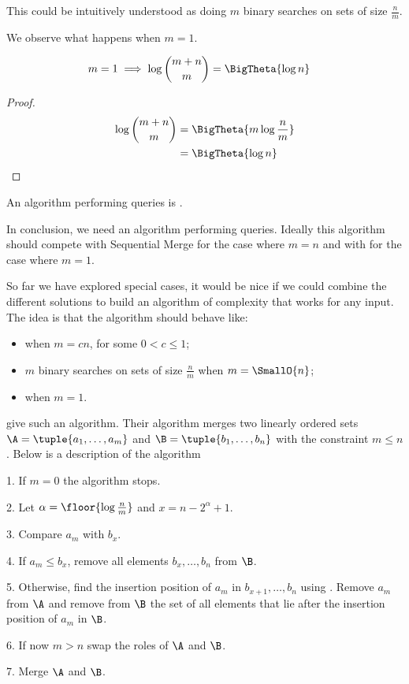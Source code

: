 This could be intuitively understood as doing $m$ binary searches on sets of
size $\frac{n}{m}$.

We observe what happens when $m = 1$.
\begin{lemma}
\begin{align*}
m = 1 &\implies \log\binom{m+n}{m} = \BigTheta{\log n}
\end{align*}
\end{lemma}
\begin{proof}
\begin{align*}
\log\binom{m+n}{m} &= \BigTheta{m \log\frac{n}{m}}\\
&= \BigTheta{\log n}\qedhere
\end{align*}
\end{proof}

An algorithm performing  queries is \binarysearch.

In conclusion, we need an algorithm performing  queries.
Ideally this algorithm should compete with Sequential Merge for the case where
$m = n$ and with \binarysearch for the case where $m = 1$.

So far we have explored special cases, it would be nice if we could
combine the different solutions to build an algorithm of complexity  that works for any input.
The idea is that the algorithm should behave like:
\begin{itemize}
\item \tapemerge when $m = cn$, for some \(0 < c \le 1\);
\item $m$ binary searches on sets of size $\frac{n}{m}$ when $m = \SmallO{n}$;
\item \binarysearch when \(m = 1\).
\end{itemize}

\citet*{DBLP:journals/siamcomp/HwangL72} give such an algorithm. Their
algorithm merges two linearly ordered sets \(\A = \tuple{a_1,\dots,a_m}\) and
\(\B = \tuple{b_1,\dots,b_n}\) with the constraint \(m \le n\). Below is a
description of the algorithm
\begin{algorithm}
\item[1.] If \(m = 0\) the algorithm stops.
\item[2.] Let \(\alpha = \floor{\log \frac{n}{m}}\) and \(x = n - 2^{\alpha} + 1\).
\item[3.] Compare \(a_m\) with \(b_x\).
\item[4.] If \(a_m \le b_x\), remove all elements \(b_x,\dots,b_n\) from
\(\B\).
\item[5.] Otherwise, find the insertion position of \(a_m\) in
\(b_{x+1},\dots,b_{n}\) using \binarysearch. Remove \(a_m\) from \(\A\) and
remove from \(\B\) the set of all elements that lie after the insertion
position of \(a_m\) in \(\B\).
\item[6.] If now \(m > n\) swap the roles of \(\A\) and \(\B\).
\item[7.] Merge \(\A\) and \(\B\).
\end{algorithm}

